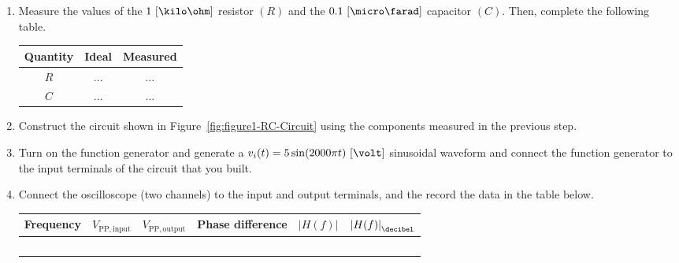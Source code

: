 \begin{enumerate}

 
\item Measure the values of the $1~[\kilo\ohm]$ resistor $(R)$ and the $0.1~[\micro\farad]$ capacitor $(C).$ Then, complete the following table.

  \begin{center}
    \begin{tabular}{c|c|c}
      \toprule
      Quantity &  Ideal & Measured\\
      \toprule
      $R$ & $\ldots$ & $\ldots$\\   %
      $C$ & $\ldots$ & $\ldots$\\   %
      \bottomrule
    \end{tabular}    
  \end{center}
  
\item Construct the circuit shown in Figure~\ref{fig:figure1-RC-Circuit} using the components measured in the previous step. 

\item  Turn on the function generator and generate a $v_i(t) = 5\sin(2000\pi t)~[\volt]$ sinusoidal waveform and connect the function generator to the input terminals of the circuit that you built. 

  
\item Connect the oscilloscope (two channels) to the input and output terminals, and the record the data in the table below. %
%
    \begin{center}
    \begin{tabular}{c|c|c|c|c|c}
      \toprule
      Frequency &  $V_{\mathrm{PP,input}}$ & $V_{\mathrm{PP,output}}$ & Phase difference & $\left |H(f) \right |$ & $\left |H(f) \right |_{\decibel}$\\
      \toprule
      ~ & ~ & ~ & ~ & ~ & ~\\
      \bottomrule
    \end{tabular}    
  \end{center}
%  
  


\end{enumerate}

